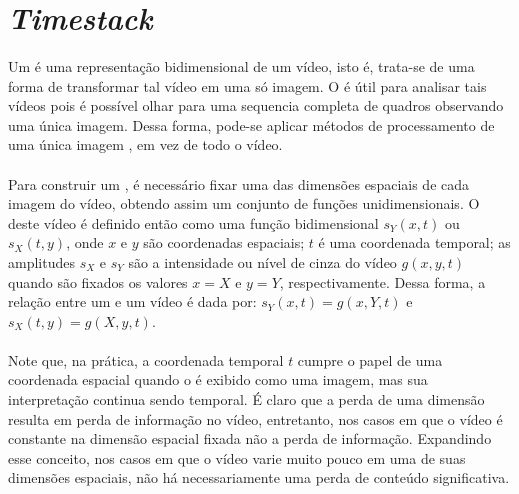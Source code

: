 \section{\textit{Timestack}}
\paragraph{}Um \timestack é uma representação bidimensional de um vídeo, isto é, trata-se de uma forma de transformar tal vídeo em uma só imagem. O \timestack é útil para analisar tais vídeos pois é possível olhar para uma sequencia completa de quadros observando uma única imagem. Dessa forma, pode-se aplicar métodos de processamento de uma única imagem  \timestack, em vez de todo o vídeo.
\paragraph{}Para construir um \timestack, é necessário fixar uma das dimensões espaciais de cada imagem do vídeo, obtendo assim um conjunto de funções unidimensionais. O \timestack deste vídeo é definido então como uma função bidimensional \(s_{Y}(x,t)\) ou \(s_{X}(t,y)\), onde \(x\) e \(y\) são coordenadas espaciais; \(t\) é uma coordenada temporal; as amplitudes \(s_{X}\) e \(s_{Y}\) são a intensidade ou nível de cinza do vídeo \(g(x,y,t)\) quando são fixados os valores \(x = X\) e \(y = Y\), respectivamente. Dessa forma, a relação entre um \timestack e um vídeo é dada por: \(s_{Y}(x,t)=g(x,Y,t)\) e \(s_{X}(t,y) = g(X,y,t)\).
\paragraph{}Note que, na prática, a coordenada temporal \(t\) cumpre o papel de uma coordenada espacial quando o \timestack é exibido como uma imagem, mas sua interpretação continua sendo temporal. É claro que a perda de uma dimensão resulta em perda de informação no vídeo, entretanto, nos casos em que o vídeo é constante na dimensão espacial fixada não a perda de informação. Expandindo esse conceito, nos casos em que o vídeo varie muito pouco em uma de suas dimensões espaciais, não há necessariamente uma perda de conteúdo significativa.
